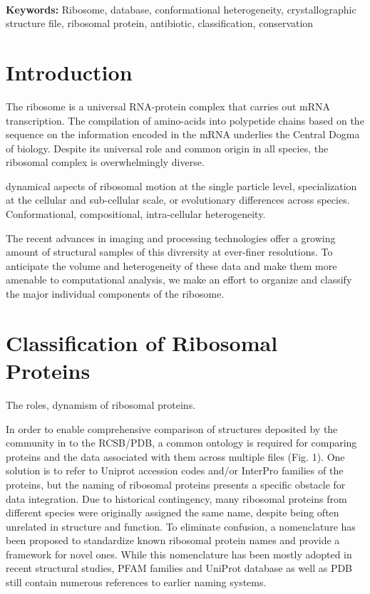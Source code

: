 \documentclass[11pt]{article}
\begin{document}
    
    \\ 
 
\textbf{Keywords:} Ribosome, database, conformational heterogeneity, crystallographic structure file, ribosomal protein, antibiotic, classification, conservation\\


\newpage
\section*{Introduction}

The ribosome is a universal RNA-protein complex that carries out mRNA transcription. The compilation of amino-acids into polypetide chains based on the sequence on the information encoded in the mRNA underlies the Central Dogma of biology. Despite its universal role and common origin in all species, the ribosomal complex is overwhelmingly diverse.

%
dynamical aspects of ribosomal motion at the single particle level, specialization at the cellular and sub-cellular scale,
or evolutionary differences across species.
Conformational, compositional, intra-cellular heterogeneity.

The recent advances in imaging and processing technologies offer a growing amount of structural samples of this divrersity at ever-finer resolutions. To anticipate the volume and heterogeneity of these data and make them more amenable to computational analysis, we make an effort to organize and classify the major individual components of the ribosome.






\section{Classification of Ribosomal Proteins}
The roles, dynamism of ribosomal proteins. %

In order to enable comprehensive comparison of structures deposited by the community in to the RCSB/PDB, a common ontology is required for comparing proteins and the data associated with them across multiple files (Fig. 1). One solution is to refer to Uniprot accession codes and/or InterPro families of the proteins, but the naming of ribosomal proteins presents a specific obstacle for data integration. Due to historical contingency, many ribosomal proteins from different species were originally assigned the same name, despite being often unrelated in structure and function. To eliminate confusion, a nomenclature has been proposed to standardize known ribosomal protein names and provide a framework for novel ones. While this nomenclature has been mostly adopted in recent structural studies, PFAM families and UniProt database as well as PDB still contain numerous references to earlier naming systems.
\end{document}
